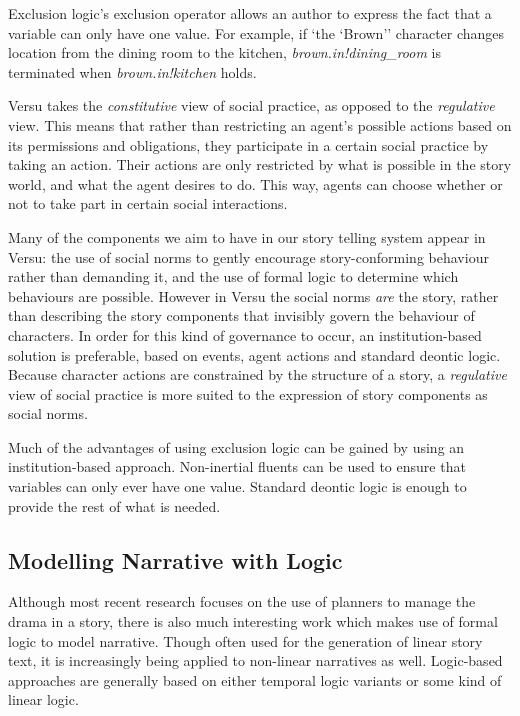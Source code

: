 Exclusion logic's exclusion operator allows an author to express the fact that a variable can only have one value. For example, if `the `Brown'' character changes location from the dining room to the kitchen, \emph{brown.in!dining\_room} is terminated when \emph{brown.in!kitchen} holds.

Versu takes the \emph{constitutive} view of social practice, as opposed to the \emph{regulative} view. This means that rather than restricting an agent's possible actions based on its permissions and obligations, they participate in a certain social practice by taking an action. Their actions are only restricted by what is possible in the story world, and what the agent desires to do. This way, agents can choose whether or not to take part in certain social interactions.

Many of the components we aim to have in our story telling system appear in Versu: the use of social norms to gently encourage story-conforming behaviour rather than demanding it, and the use of formal logic to determine which behaviours are possible. However in Versu the social norms \emph{are} the story, rather than describing the story components that invisibly govern the behaviour of characters. In order for this kind of governance to occur, an institution-based solution is preferable, based on events, agent actions and standard deontic logic. Because character actions are constrained by the structure of a story, a \emph{regulative}  view of social practice is more suited to the expression of story components as social norms.

Much of the advantages of using exclusion logic can be gained by using an institution-based approach. Non-inertial fluents can be used to ensure that variables can only ever have one value. Standard deontic logic is enough to provide the rest of what is needed.

\subsection{Modelling Narrative with Logic}
\label{sec:model-logic}
Although most recent research focuses on the use of planners to manage the drama in a story, there is also much interesting work which makes use of formal logic to model narrative. Though often used for the generation of linear story text, it is increasingly being applied to non-linear narratives as well. Logic-based approaches are generally based on either temporal logic variants or some kind of linear logic.

